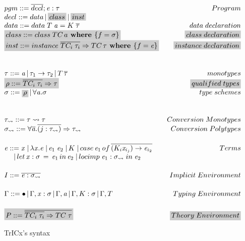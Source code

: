 \begin{figure}
   \[
\begin{array}{@{\hspace{0mm}}l@{\hspace{0mm}}}
  pgm ::= \overline{decl};\term:\type\hfill Program\\
  decl ::= data\,|\,\highlight{class}\,|\,\highlight{inst}\\
  data ::= data\;T\;\tyVar=K\;\overline{\type}\hfill data\;declaration\\
  \highlight{class ::=class\; TC\,a\textbf{ where }\{f=\typeS\}} \hfill \highlight{class\;declaration}\\
  \highlight{inst ::=instance\; \overline{TC_i\;\type_i}\Rightarrow TC \,\type\textbf{ where }\{f=\term\}} \hfill \highlight{instance \; declaration}\\
  \\[5mm]
  \type ::= \tyVar\,|\,\type_1\to\type_2\,|\,T\,\overline{\type}\hfill monotypes\\
  \highlight{\qtype ::= \overline{TC_i\;\type_i} \Rightarrow \type} \hfill \highlight{qualified\;types}\\
  \typeS ::= \highlight{\qtype}\,|\,\forall\tyVar.\typeS\hfill type\;schemes\\
  \\[5mm]
    \type_{\rightsquigarrow} ::= \type \rightsquigarrow \type\hfill Conversion\;Monotypes\\
  \typeS_{\rightsquigarrow} ::= \forall \overline {\tyVar} . \overline{(j : \type_{\rightsquigarrow})} \Rightarrow \type_{\rightsquigarrow}\hfill Conversion\;Polytypes
  \\[5mm]
  \term ::= \tmVar\;|\,\lambda \tmVar.\term\;|\,\term_1 \; \term_2\;|\, K \;|\, case \, \term_1 \, of\, \overline{(K_i \tmVar_{i_j}) \rightarrow \term_{i_2}} \hfill Terms\\
  \phantom{\term ::}|\, let \, \tmVar : \typeS \, =\, \term_1 \,in\, \term_2  \;|\, locimp \; \term_1 : \typeS_{\rightsquigarrow}\; in\; \term_2
  \\[5mm]
  \imEnv::=\overline{\term : \typeS_{\rightsquigarrow}} \hfill Implicit\;Environment
  \\[5mm]
  \tyEnv::=\bullet\,|\,\tyEnv,\tmVar:\typeS\,|\,\tyEnv,\tyVar\,|\,\tyEnv,K:\typeS\,|\,\tyEnv,T \hfill \phantom{xxxxxxxxxxxxxxx} Typing\; Environment\\[5mm]
  \highlight{\thEnv::=\overline{\overline{TC_i\;\type_i}\Rightarrow TC\;\type}}\hfill \highlight{Theory\;Environment}\\

  \end{array}
\]
  \caption{TrICx's syntax}
  \label{tcsyntax}
\end{figure}

